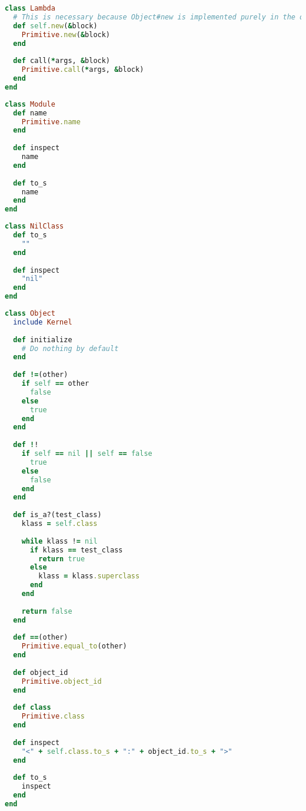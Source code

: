 \begin{lstlisting}[title={\small\ttfamily\bfseries kernel/lambda.carat},language=Ruby]
class Lambda
  # This is necessary because Object#new is implemented purely in the object language
  def self.new(&block)
    Primitive.new(&block)
  end
  
  def call(*args, &block)
    Primitive.call(*args, &block)
  end
end

\end{lstlisting}
\begin{lstlisting}[title={\small\ttfamily\bfseries kernel/module.carat},language=Ruby]
class Module
  def name
    Primitive.name
  end
  
  def inspect
    name
  end
  
  def to_s
    name
  end
end

\end{lstlisting}
\begin{lstlisting}[title={\small\ttfamily\bfseries kernel/nil\_class.carat},language=Ruby]
class NilClass
  def to_s
    ""
  end
  
  def inspect
    "nil"
  end
end

\end{lstlisting}
\begin{lstlisting}[title={\small\ttfamily\bfseries kernel/object.carat},language=Ruby]
class Object
  include Kernel
  
  def initialize
    # Do nothing by default
  end
  
  def !=(other)
    if self == other
      false
    else
      true
    end
  end
  
  def !!
    if self == nil || self == false
      true
    else
      false
    end
  end
  
  def is_a?(test_class)
    klass = self.class
    
    while klass != nil
      if klass == test_class
        return true
      else
        klass = klass.superclass
      end
    end
    
    return false
  end
  
  def ==(other)
    Primitive.equal_to(other)
  end
  
  def object_id
    Primitive.object_id
  end
  
  def class
    Primitive.class
  end
  
  def inspect
    "<" + self.class.to_s + ":" + object_id.to_s + ">"
  end
  
  def to_s
    inspect
  end
end

\end{lstlisting}
